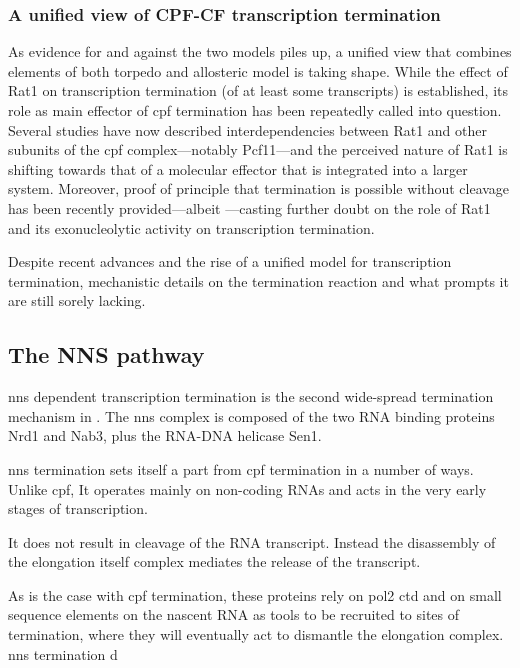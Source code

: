 \subsubsection{A unified view of CPF-CF transcription termination}

As evidence for and against the two models piles up, a unified view that combines elements of both torpedo and allosteric model is taking shape.
While the effect of Rat1 on transcription termination (of at least some transcripts) is established, its role as main effector of \gls{cpf} termination has been repeatedly called into question.
Several studies have now described interdependencies between Rat1 and other subunits of the \gls{cpf} complex---notably Pcf11---and the perceived nature of Rat1 is shifting towards that of a molecular effector  that is integrated into a larger system.
Moreover, proof of principle that termination is possible without cleavage has been recently provided---albeit \invitro{}---casting further doubt on the role of Rat1 and its exonucleolytic activity on transcription termination.

Despite recent advances and the rise of a unified model for transcription termination, mechanistic details on the termination reaction and what prompts it are still sorely lacking.



\subsection{The NNS pathway}

\gls{nns} dependent transcription termination is the second wide-spread termination mechanism in \cer{}.
The \gls{nns} complex is composed of the two RNA binding proteins Nrd1 and Nab3, plus the RNA-DNA helicase Sen1. 

\gls{nns} termination sets itself a part from \gls{cpf} termination in a number of ways.  
Unlike \gls{cpf}, It operates mainly on non-coding RNAs and acts in the very early stages of transcription.


It does not result in cleavage of the RNA transcript.
Instead the disassembly of the elongation itself complex mediates the release of the transcript. 



As is the case with \gls{cpf} termination, these proteins rely on \gls{pol2} \gls{ctd} and on small sequence elements on the nascent RNA as tools to be recruited to sites of termination, where they will eventually act to dismantle the elongation complex.
\gls{nns} termination d

